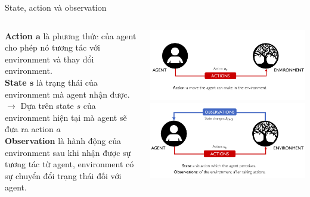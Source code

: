 \documentclass[10pt,aspectratio=169]{beamer}
\begin{document}
\begin{frame}{State, action và observation}{\subsecname}
\begin{columns}
\begin{column}{0.4\textwidth}
\textbf{Action $ \boldsymbol{a} $} là phương thức của agent cho phép nó tương tác với environment và thay đổi environment.\\
\vspace{8pt}
\textbf{State $ \boldsymbol{s} $} là trạng thái của environment mà agent nhận được.\\
\vspace{8pt}
$ \longrightarrow $ Dựa trên state $ s $ của environment hiện tại mà agent sẽ đưa ra action $ a $\\
\vspace{20pt}
\textbf{Observation} là hành động của environment sau khi nhận được sự tương tác từ agent, environment có sự chuyển đổi trạng thái đối với agent.\\
\end{column}
\begin{column}{0.5\textwidth}
\includegraphics[width=\textwidth]{source/3.png}\\
\includegraphics[width=\textwidth]{source/4.png}\\
\end{column}
\end{columns}
\end{frame}
\end{document}
